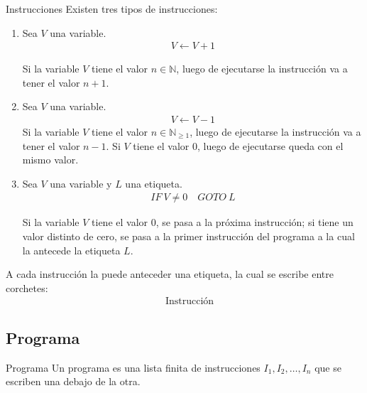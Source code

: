 \begin{definicion}{Instrucciones}{}
    Existen tres tipos de instrucciones:
    \begin{enumerate}
        \item Sea $V$ una variable.
            \begin{gather*}
                V \gets V + 1
            \end{gather*}

            Si la variable $V$ tiene el valor $n \in \mathbb{N}$, luego de
            ejecutarse la instrucción va a tener el valor $n+1$.
        \item Sea $V$ una variable.
            \begin{gather*}
                V \gets V - 1
            \end{gather*}
            Si la variable $V$ tiene el valor $n \in \mathbb{N}_{\geq 1}$, 
            luego de ejecutarse la instrucción va a tener el valor $n-1$.
            Si $V$ tiene el valor 0, luego de ejecutarse queda con el mismo
            valor.
        \item Sea $V$ una variable y $L$ una etiqueta.
            \begin{gather*}
                IF ~ V \neq 0 \quad GOTO ~ L
            \end{gather*}

            Si la variable $V$ tiene el valor 0, se pasa a la próxima 
            instrucción; si tiene un valor distinto de cero, se pasa a la 
            primer instrucción del programa a la cual la antecede la etiqueta
            $L$.
    \end{enumerate}

    A cada instrucción la puede anteceder una etiqueta, la cual se escribe
    entre corchetes:
    \begin{gather*}
        [L] \quad \text{Instrucción}
    \end{gather*}
\end{definicion}

\subsection{Programa}

\begin{definicion}{Programa}{}
   Un programa es una lista finita de instrucciones $I_1, I_2, \dotsc, I_n$
   que se escriben una debajo de la otra.
\end{definicion}

